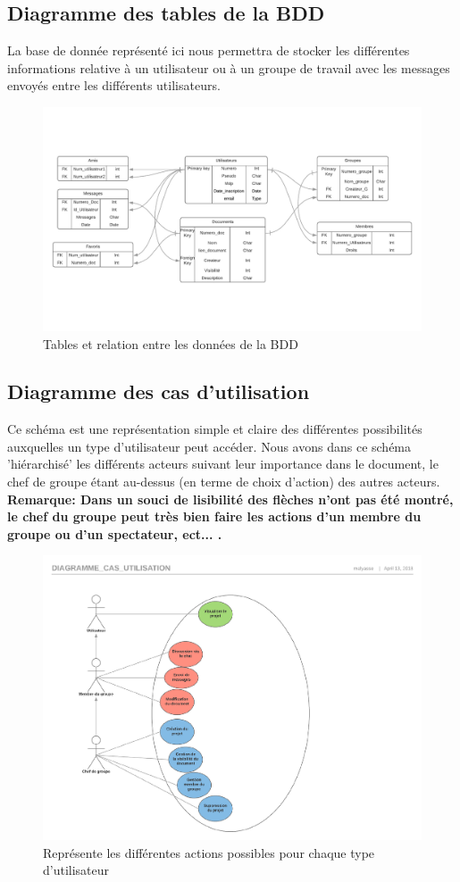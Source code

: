 \documentclass[11pt,a4paper]{article}
\begin{document}
\subsection{Diagramme des tables de la BDD}
La base de donnée représenté ici nous permettra de stocker les différentes informations relative à un utilisateur ou à un groupe de travail avec les messages envoyés entre les différents utilisateurs.
\begin{figure}[!h]
\centering
\includegraphics[scale=0.6]{Image/Diagramme_BDD.pdf}
\caption{Tables et relation entre les données de la BDD}
\end{figure}
\subsection{Diagramme des cas d'utilisation}
Ce schéma est une représentation simple et claire des différentes possibilités auxquelles un type d'utilisateur peut accéder. Nous avons dans ce schéma 'hiérarchisé' les différents acteurs suivant leur importance dans le document, le chef de groupe étant au-dessus (en terme de choix d'action) des autres acteurs. \\
\textbf{Remarque: Dans un souci de lisibilité des flèches n'ont pas été montré, le chef du groupe peut très bien faire les actions d'un membre du groupe ou d'un spectateur, ect... .}
\begin{figure}[!h]
\centering
\includegraphics[scale=0.5]{Image/Diagramme_cas_utilisation.pdf}
\caption{Représente les différentes actions possibles pour chaque type d'utilisateur}
\end{figure}
\end{document}
